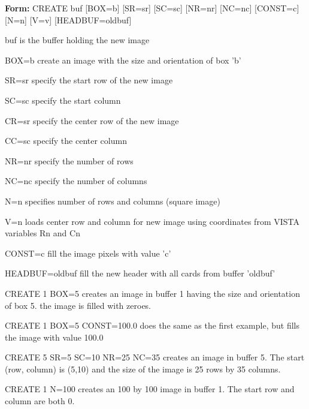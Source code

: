 {\newpage\clearpage
{}%
\begin{command}
  \item[\textbf{Form: } CREATE buf {[BOX=b]} {[SR=sr]} {[SC=sc]} {[NR=nr]} 
       {[NC=nc]} {[CONST=c]} {[N=n]} {[V=v]} {[HEADBUF=oldbuf]} \hfill]{}
  \item[buf]{is the buffer holding the new image}
  \item[BOX=b]{create an image with the size and orientation of box 'b'}
  \item[SR=sr]{specify the start row of the new image}
  \item[SC=sc]{specify the start column}
  \item[CR=sr]{specify the center row of the new image}
  \item[CC=sc]{specify the center column}
  \item[NR=nr]{specify the number of rows}
  \item[NC=nc]{specify the number of columns}
  \item[N=n]{specifies number of rows and columns (square image)}
  \item[V=n]{loads center row and column for new image using
       coordinates from VISTA variables Rn and Cn}
  \item[CONST=c]{fill the image pixels with value 'c'}
  \item[HEADBUF=oldbuf]{fill the new header with all cards from buffer 'oldbuf'}
\end{command}%
\lthtmlfigureZ
\lthtmlcheckvsize\clearpage}

{\newpage\clearpage
{}%
\begin{example}
  \item[CREATE 1 BOX=5 \hfill]{creates an image in buffer 1 having 
       the size and orientation of box 5.  the image is filled with zeroes.}
  \item[CREATE 1 BOX=5 CONST=100.0\hfill]{does the same as the first example, 
       but fills the image with value 100.0}
  \item[CREATE 5 SR=5 SC=10 NR=25 NC=35\hfill]{creates an image in buffer 5.  
       The start (row, column) is (5,10) and the size of the image is 25 rows by
       35 columns.}
  \item[CREATE 1 N=100\hfill]{creates an 100 by 100 image in buffer 1.
       The start row and column are both 0.}
\end{example}%
\lthtmlfigureZ
\lthtmlcheckvsize\clearpage}

